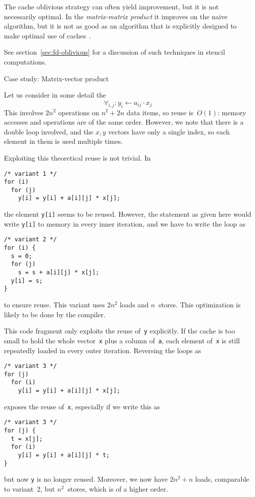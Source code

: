 The cache oblivious strategy can often yield improvement, but it is
not necessarily optimal. In the
%
\emph{matrix-matrix product}
it improves on
the naive algorithm, but it is not as good as an algorithm that is
explicitly designed to make optimal use of
caches~\cite{GotoGeijn:2008:Anatomy}.

See section~\ref{sec:fd-oblivious} for a discussion of such techniques
in stencil computations.


 {Case study: Matrix-vector product}
\label{sec:mvp-opt}

Let us consider in some detail
the 
\[ \forall_{i,j}\colon y_i\leftarrow a_{ij}\cdot x_j \] This involves $2n^2$
operations on $n^2+2n$ data items, so reuse is~$O(1)$: memory accesses
and operations are of the same order. However, we note that there is a
double loop involved, and the $x,y$ vectors have only a single index,
so each element in them is used multiple times.

Exploiting this theoretical reuse is not trivial. In
\begin{verbatim}
/* variant 1 */
for (i)
  for (j)
    y[i] = y[i] + a[i][j] * x[j];
\end{verbatim}
the element \texttt{y[i]} seems to be reused. However, the statement
as given here would write \texttt{y[i]} to memory in every inner
iteration, and we have to write the loop as
\begin{verbatim}
/* variant 2 */
for (i) {
  s = 0;
  for (j)
    s = s + a[i][j] * x[j];
  y[i] = s;
}
\end{verbatim}
to ensure reuse. This variant uses $2n^2$ loads and $n$~stores.
This optimization is likely to be done by the compiler.

This code fragment only exploits the reuse
of~\texttt{y} explicitly. If the cache is too small to hold the whole
vector~\texttt{x} plus a column of~\texttt{a}, each element
of~\texttt{x} is still repeatedly loaded in every outer iteration.
%
Reversing the loops as
\begin{verbatim}
/* variant 3 */
for (j)
  for (i)
    y[i] = y[i] + a[i][j] * x[j];
\end{verbatim}
exposes the reuse of~\texttt{x}, especially if we write this as
\begin{verbatim}
/* variant 3 */
for (j) {
  t = x[j];
  for (i)
    y[i] = y[i] + a[i][j] * t;
}
\end{verbatim}
but now \texttt{y} is no longer
reused. Moreover, we now have $2n^2+n$ loads, comparable to variant~2,
but $n^2$~stores, which is of a higher order.

